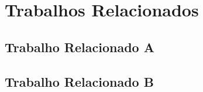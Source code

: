 \chapter{Trabalhos Relacionados}
\label{cap:trabalhos-relacionados}



\section{Trabalho Relacionado A}
\label{sec:trabalho-relacionado-a}



	


\section{Trabalho Relacionado B}
\label{sec:trabalho-relacionado-b}

